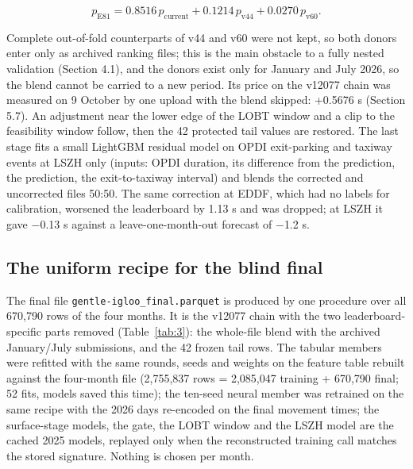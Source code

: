 \documentclass[11pt,a4paper]{article}
\begin{document}
\begin{equation}p_{\mathrm{E81}} = 0.8516\,p_{\mathrm{current}} + 0.1214\,p_{\mathrm{v44}} + 0.0270\,p_{\mathrm{v60}}.\end{equation}

Complete out-of-fold counterparts of v44 and v60 were not kept, so both donors enter only as archived ranking files; this is the main obstacle to a fully nested validation (Section 4.1), and the donors exist only for January and July 2026, so the blend cannot be carried to a new period. Its price on the v12077 chain was measured on 9 October by one upload with the blend skipped: +0.5676 s (Section 5.7). An adjustment near the lower edge of the LOBT window and a clip to the feasibility window follow, then the 42 protected tail values are restored. The last stage fits a small LightGBM residual model on OPDI exit-parking and taxiway events at LSZH only (inputs: OPDI duration, its difference from the prediction, the prediction, the exit-to-taxiway interval) and blends the corrected and uncorrected files 50:50. The same correction at EDDF, which had no labels for calibration, worsened the leaderboard by 1.13 s and was dropped; at LSZH it gave $-$0.13 s against a leave-one-month-out forecast of $-$1.2 s.

\subsection{The uniform recipe for the blind final}\label{the-uniform-recipe-for-the-blind-final}

The final file \texttt{gentle-igloo\_\allowbreak{}final.parquet} is produced by one procedure over all 670,790 rows of the four months. It is the v12077 chain with the two leaderboard-specific parts removed (Table~\ref{tab:3}): the whole-file blend with the archived January/July submissions, and the 42 frozen tail rows. The tabular members were refitted with the same rounds, seeds and weights on the feature table rebuilt against the four-month file (2,755,837 rows = 2,085,047 training + 670,790 final; 52 fits, models saved this time); the ten-seed neural member was retrained on the same recipe with the 2026 days re-encoded on the final movement times; the surface-stage models, the gate, the LOBT window and the LSZH model are the cached 2025 models, replayed only when the reconstructed training call matches the stored signature. Nothing is chosen per month.
\end{document}

